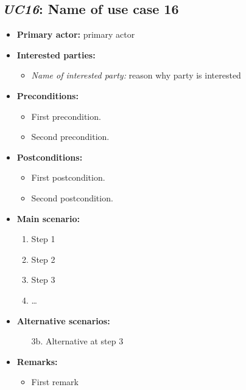 \documentclass[a4paper,10pt]{article}
\begin{document}
\subsection{\emph{UC16}: Name of use case 16}
\begin{itemize}
    \item \textbf{Primary actor:} primary actor
    \item \textbf{Interested parties:} 
        \begin{itemize}
            \item \textit{Name of interested party:} reason why party is interested
        \end{itemize}

    \item \textbf{Preconditions:}
        \begin{itemize}
            \item First precondition.
            \item Second precondition.
        \end{itemize}

    \item \textbf{Postconditions:}
        \begin{itemize}
            \item First postcondition.
            \item Second postcondition.
        \end{itemize}
        
    \item \textbf{Main scenario:} 
    \begin{enumerate}
       \item Step 1
       \item Step 2
       \item Step 3
       \item \ldots
    \end{enumerate}

    \item \textbf{Alternative scenarios:} 
    \begin{enumerate}
        \item [3b.] Alternative at step 3
    \end{enumerate}
    
    \item \textbf{Remarks:}
        \begin{itemize}
            \item First remark
        \end{itemize}
\end{itemize}
\end{document}

